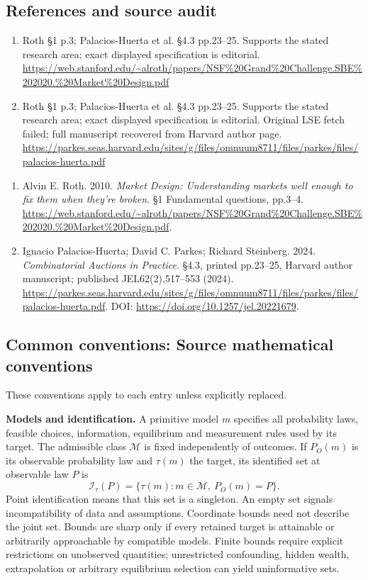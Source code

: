\documentclass[11pt,a4paper]{article}
\begin{document}
\subsection*{References and source audit}
\begin{enumerate}
\item Roth §1 p.3; Palacios-Huerta et al. §4.3 pp.23–25. Supports the stated research area; exact displayed specification is editorial. \url{https://web.stanford.edu/~alroth/papers/NSF%20Grand%20Challenge.SBE%202020.%20Market%20Design.pdf}
\item Roth §1 p.3; Palacios-Huerta et al. §4.3 pp.23–25. Supports the stated research area; exact displayed specification is editorial. Original LSE fetch failed; full manuscript recovered from Harvard author page. \url{https://parkes.seas.harvard.edu/sites/g/files/omnuum8711/files/parkes/files/palacios-huerta.pdf}
\end{enumerate}
\begin{enumerate}\raggedright
\item\hypertarget{definitions:source:30007576:1}{} Alvin E. Roth. 2010. \emph{Market Design: Understanding markets well enough to fix them when they’re broken}. §1 Fundamental questions, pp.3–4.
\url{https://web.stanford.edu/~alroth/papers/NSF%20Grand%20Challenge.SBE%202020.%20Market%20Design.pdf}.
\item\hypertarget{definitions:source:30007576:2}{} Ignacio Palacios-Huerta; David C. Parkes; Richard Steinberg. 2024. \emph{Combinatorial Auctions in Practice}. §4.3, printed pp.23–25, Harvard author manuscript; published JEL62(2),517–553 (2024).
\url{https://parkes.seas.harvard.edu/sites/g/files/omnuum8711/files/parkes/files/palacios-huerta.pdf}.
DOI: \url{https://doi.org/10.1257/jel.20221679}.
\end{enumerate}

\subsection*{Common conventions: Source mathematical conventions}

These conventions apply to each entry unless explicitly replaced.

\textbf{Models and identification.} A primitive model \(m\) specifies all probability laws, feasible choices, information, equilibrium and measurement rules used by its target. The admissible class \(\mathcal M\) is fixed independently of outcomes. If \(P_O(m)\) is its observable probability law and \(\tau(m)\) the target, its identified set at observable law \(P\) is
\[
 \mathcal I_\tau(P)=\{\tau(m):m\in\mathcal M,\ P_O(m)=P\}.
\]
Point identification means that this set is a singleton. An empty set signals incompatibility of data and assumptions. Coordinate bounds need not describe the joint set. Bounds are sharp only if every retained target is attainable or arbitrarily approachable by compatible models. Finite bounds require explicit restrictions on unobserved quantities; unrestricted confounding, hidden wealth, extrapolation or arbitrary equilibrium selection can yield uninformative sets.
\end{document}
